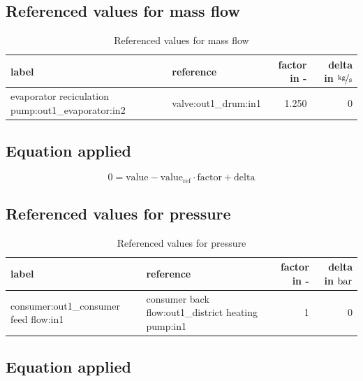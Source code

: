 \subsection{Referenced values for mass flow}

\begin{table}[H]\begin{center}
\begin{tabular}{llrr}
\toprule
                                             label &             reference &  factor in - &  delta in $\unitfrac[]{kg}{s}$ \\
\midrule
 evaporator reciculation pump:out1\_evaporator:in2 &  valve:out1\_drum:in1 &        1.250 &                              0 \\
\bottomrule
\end{tabular}
\caption{Referenced values for mass flow}
\end{center}\end{table}

\subsection{Equation applied}

\begin{equation}
\label{eq:Connection_ref}
0 = \text{value} - \text{value}_\mathrm{ref} \cdot \mathrm{factor} + \text{delta}
\end{equation}

\subsection{Referenced values for pressure}

\begin{table}[H]\begin{center}
\begin{tabular}{llrr}
\toprule
                                 label &                                           reference &  factor in - &  delta in $\unit[]{bar}$ \\
\midrule
 consumer:out1\_consumer feed flow:in1 &  consumer back flow:out1\_district heating pump:in1 &            1 &                        0 \\
\bottomrule
\end{tabular}
\caption{Referenced values for pressure}
\end{center}\end{table}

\subsection{Equation applied}

